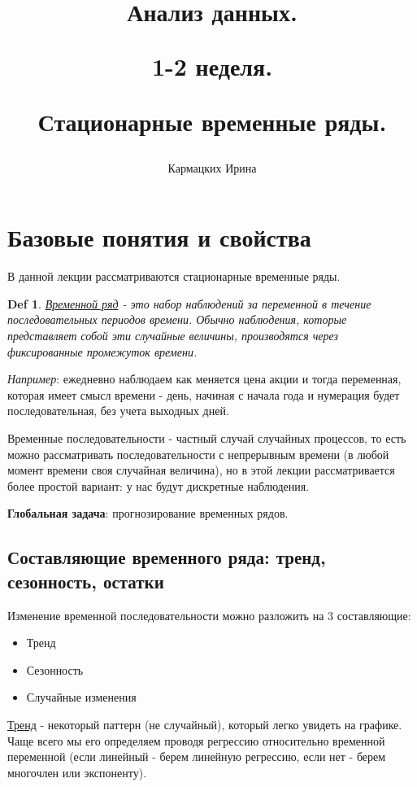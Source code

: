 \documentclass{article}
\title{Анализ данных.

1-2 неделя.

Стационарные временные ряды.}
\author{Кармацких Ирина}
\newtheorem*{definition}{Def}
\begin{document}
\maketitle

\setcounter{tocdepth}{2} %
\renewcommand\contentsname{Содержание}
\tableofcontents
\newpage

\section{Базовые понятия и свойства}
В данной лекции рассматриваются стационарные временные ряды. 
\begin{definition} \label{d1} 
\underline{Временной ряд} - это набор наблюдений за переменной в течение последовательных периодов времени. Обычно наблюдения, которые представляет собой эти случайные величины, производятся через фиксированные промежуток времени. 
\end{definition}

\textit{Например}: ежедневно наблюдаем как меняется цена акции и тогда переменная, которая имеет смысл времени - день, начиная с начала года и нумерация будет последовательная, без учета выходных дней. 

Временные последовательности - частный случай случайных процессов, то есть можно рассматривать последовательности с непрерывным времени (в любой момент времени своя случайная величина), но в этой лекции рассматривается более простой вариант: у нас будут дискретные наблюдения. 

\textbf{Глобальная задача}: прогнозирование временных рядов.

\subsection{Составляющие временного ряда: тренд, сезонность, остатки}
Изменение временной последовательности можно разложить на 3 составляющие:
\begin{itemize}
    \item Тренд 
    \item Сезонность 
    \item Случайные изменения
\end{itemize}

\underline{Тренд} - некоторый паттерн (не случайный), который легко увидеть на графике. Чаще всего мы его определяем проводя регрессию относительно временной переменной (если линейный - берем линейную регрессию, если нет - берем многочлен или экспоненту). 
\end{document}
